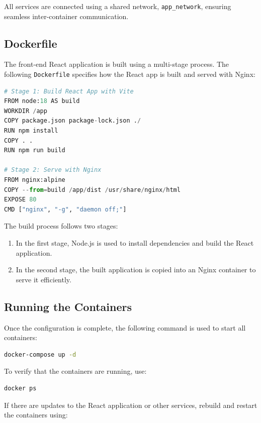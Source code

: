 \documentclass[a4paper,12pt]{report}
\begin{document}
All services are connected using a shared network, \texttt{app\_network}, ensuring seamless inter-container communication.

\subsection{Dockerfile}

The front-end React application is built using a multi-stage process. The following \texttt{Dockerfile} specifies how the React app is built and served with Nginx:

\begin{lstlisting}[language=python]
# Stage 1: Build React App with Vite
FROM node:18 AS build
WORKDIR /app
COPY package.json package-lock.json ./
RUN npm install
COPY . . 
RUN npm run build

# Stage 2: Serve with Nginx
FROM nginx:alpine
COPY --from=build /app/dist /usr/share/nginx/html
EXPOSE 80
CMD ["nginx", "-g", "daemon off;"]
\end{lstlisting}

\noindent
The build process follows two stages:
\begin{enumerate}
    \item In the first stage, Node.js is used to install dependencies and build the React application.
    \item In the second stage, the built application is copied into an Nginx container to serve it efficiently.
\end{enumerate}

\subsection{Running the Containers}

Once the configuration is complete, the following command is used to start all containers:

\begin{lstlisting}[language=bash]
docker-compose up -d
\end{lstlisting}

To verify that the containers are running, use:

\begin{lstlisting}[language=bash]
docker ps
\end{lstlisting}

If there are updates to the React application or other services, rebuild and restart the containers using:
\end{document}
